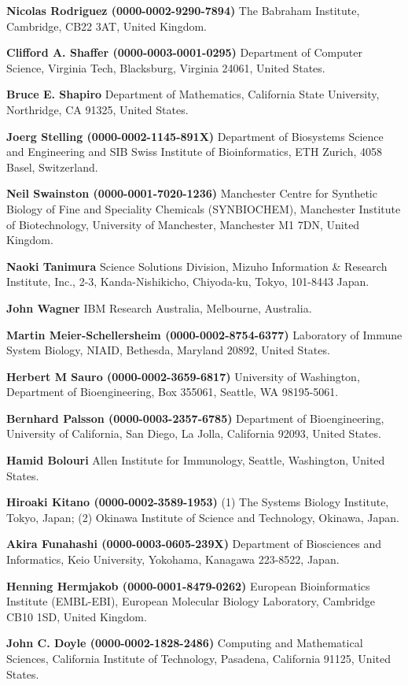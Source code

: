 \documentclass{sbml-paper}
\begin{document}
\textbf{Nicolas Rodriguez (0000-0002-9290-7894)} The Babraham Institute, Cambridge, CB22 3AT, United Kingdom.

\textbf{Clifford A. Shaffer (0000-0003-0001-0295)} Department of Computer Science, Virginia Tech, Blacksburg, Virginia 24061, United States.

\textbf{Bruce E. Shapiro} Department of Mathematics, California State University, Northridge, CA 91325, United States.

\textbf{Joerg Stelling (0000-0002-1145-891X)} Department of Biosystems Science and Engineering and SIB Swiss Institute of Bioinformatics, ETH Zurich, 4058 Basel, Switzerland.

\textbf{Neil Swainston (0000-0001-7020-1236)} Manchester Centre for Synthetic Biology of Fine and Speciality Chemicals (SYNBIOCHEM), Manchester Institute of Biotechnology, University of Manchester, Manchester M1 7DN, United Kingdom.

\textbf{Naoki Tanimura} Science Solutions Division, Mizuho Information \& Research Institute, Inc., 2-3, Kanda-Nishikicho, Chiyoda-ku, Tokyo, 101-8443 Japan.

\textbf{John Wagner} IBM Research Australia, Melbourne, Australia.

\textbf{Martin Meier-Schellersheim (0000-0002-8754-6377)} Laboratory of Immune System Biology, NIAID, Bethesda, Maryland 20892, United States.

\textbf{Herbert M Sauro (0000-0002-3659-6817)} University of Washington, Department of Bioengineering, Box 355061, Seattle, WA 98195-5061.

\textbf{Bernhard Palsson (0000-0003-2357-6785)} Department of Bioengineering, University of California, San Diego, La Jolla, California 92093, United States.

\textbf{Hamid Bolouri} Allen Institute for Immunology, Seattle, Washington, United States.

\textbf{Hiroaki Kitano (0000-0002-3589-1953)} (1) The Systems Biology Institute, Tokyo, Japan; (2) Okinawa Institute of Science and Technology, Okinawa, Japan.

\textbf{Akira Funahashi (0000-0003-0605-239X)} Department of Biosciences and Informatics, Keio University, Yokohama, Kanagawa 223-8522, Japan.

\textbf{Henning Hermjakob (0000-0001-8479-0262)} European Bioinformatics Institute (EMBL-EBI), European Molecular Biology Laboratory, Cambridge CB10 1SD, United Kingdom.

\textbf{John C. Doyle (0000-0002-1828-2486)} Computing and Mathematical Sciences, California Institute of Technology, Pasadena, California 91125, United States.
\end{document}
